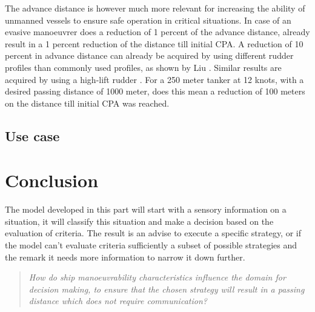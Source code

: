 The advance distance is however much more relevant for increasing the ability of unmanned vessels to ensure safe operation in critical situations. In case of an evasive manoeuvrer does a reduction of 1 percent of the advance distance, already result in a 1 percent reduction of the distance till initial CPA.
A reduction of 10 percent in advance distance can already be acquired by using different rudder profiles than commonly used profiles, as shown by Liu \cite{Liu2015a}. Similar results are acquired by using a high-lift rudder \cite{Zaky2018}. For a 250 meter tanker at 12 knots, with a desired passing distance of 1000 meter, does this mean a reduction of 100 meters on the distance till initial CPA was reached.

\section{Use case}


\chapter{Conclusion}
The model developed in this part will start with a sensory information on a situation, it will classify this situation and make a decision based on the evaluation of criteria. The result is an advise to execute a specific strategy, or if the model can't evaluate criteria sufficiently a subset of possible strategies and the remark it needs more information to narrow it down further.

\begin{quotation}
	\emph{How do ship manoeuvrability characteristics influence the domain for decision making, to ensure that the chosen strategy will result in a passing distance which does not require communication?} 
\end{quotation}
